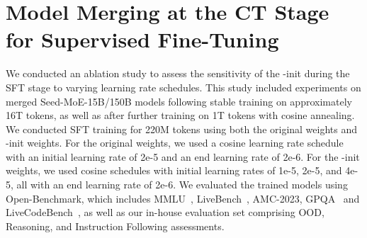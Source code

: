 \section{Model Merging at the CT Stage for Supervised Fine-Tuning}
\label{app-sft}
We conducted an ablation study to assess the sensitivity of the \OURS{}-init during the SFT stage to varying learning rate schedules.
This study included experiments on merged Seed-MoE-15B/150B models following stable training on approximately 16T tokens, as well as after further training on 1T tokens with cosine annealing.
We conducted SFT training for 220M tokens using both the original weights and \OURS{}-init weights. For the original weights, we used a cosine learning rate schedule with an initial learning rate of 2e-5 and an end learning rate of 2e-6. For the \OURS{}-init weights, we used cosine schedules with initial learning rates of 1e-5, 2e-5, and 4e-5, all with an end learning rate of 2e-6. We evaluated the trained models using Open-Benchmark, which includes MMLU~\cite{hendrycks2020measuring}, LiveBench~\cite{white2024livebench}, AMC-2023, GPQA~\cite{rein2024gpqa} and LiveCodeBench~\cite{white2024livebench}, as well as our in-house evaluation set comprising OOD, Reasoning, and Instruction Following assessments.
\begin{table}[h]
    \caption{Comparisons of performance metrics during SFT stage with varying $lr$ schedules, where a cosine scheduler is adopted to decay learning rate from $lr_{peak}$ to $lr_{end}$ (denoted as $lr_{peak} \rightarrow lr_{end}$). $\texttt{PMA}$ and $\texttt{baseline}$, stand for whether our \texttt{\OURS{}-init} technique is employed or not, respectively. IF refers to Instruction Following. }
    \centering

    \label{sfteval}
\end{table}
